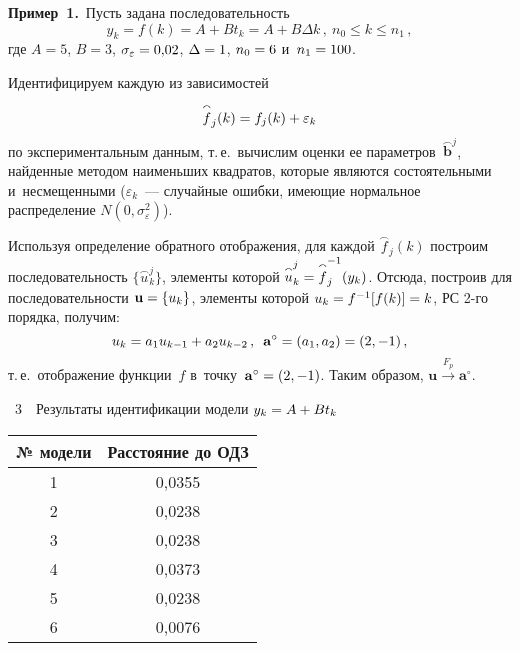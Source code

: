 \begin{multicols}{2}
  \textbf{Пример~1.}\ Пусть задана последовательность
  $$
  y_k=f(k)=A+Bt_k=A+B\Delta k\,,\ n_0\leq k\leq n_1\,,
  $$
где $A=5$, $B = 3$, $\sigma_\varepsilon\hm=0{,}02$, $\Delta\hm=1$, 
$n_0\hm=6$ и~$n_1\hm=100$.
  
  Идентифицируем каждую из зависимостей 
  $$
  \overset{\smallfrown}{f}_j(k)=  f_j(k)\hm+\varepsilon_k
$$ 
по экспериментальным данным, т.\,е.\ вычислим 
оценки ее параметров~$\overset{\smallfrown}{\mathbf{b}}^j$, найденные методом 
наименьших квадратов, которые являются состоятельными и~несмещенными 
($\varepsilon_k$~--- случайные ошибки, имеющие нормальное распределение 
$N(0,\sigma_\varepsilon^2)$).
  
  Используя определение обратного отображения, для каждой 
$\overset{\smallfrown}{f}_j(k)$ построим последовательность 
$\{\overset{\smallfrown}{u}_k^j\}$, элементы которой $\overset{\smallfrown}{u}_k^j \hm= 
\overset{\smallfrown}{f}_j^{-1}(y_k)$. Отсюда, построив для последовательности 
$\mathbf{u}\hm= \{u_k\}$, элементы которой $u_k\hm= f^{-1}[f(k)]\hm= k$, РС 
2-го порядка, получим:
  $$
  u_k=a_1 u_{k-1} +a_2 u_{k-2}\,,\enskip
  \mathbf{a}^\circ = \left(a_1,a_2\right)=(2,-1)\,,
  $$
т.\,е.\ отображение функции~$f$ в~точку~$\mathbf{a}^\circ\hm=(2,-1)$. Таким 
образом, $\mathbf{u}\overset{F_p}{\to} \mathbf{a}^\circ$.



\begin{center}
\vspace*{-1pt}

\noindent
\parbox{150pt}{{{\tablename~3}\ \ \small{Результаты идентификации модели $y_k\hm= A\hm+Bt_k$}}
}

\vspace*{6pt}

{\small
\begin{tabular}{|c|c|}
\hline
№ модели&Расстояние до ОДЗ\\
\hline
1&0,0355\\
2&0,0238\\
3&0,0238\\
4&0,0373\\
5&0,0238\\
6&0,0076\\
\hline
\end{tabular}
\vspace*{6pt}
}
\end{center}


\end{multicols}
